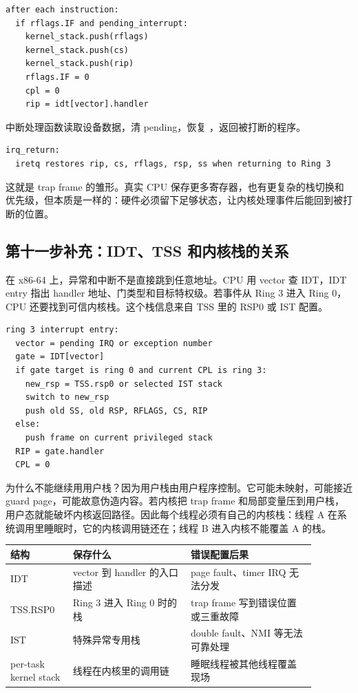 \begin{lstlisting}
after each instruction:
  if rflags.IF and pending_interrupt:
    kernel_stack.push(rflags)
    kernel_stack.push(cs)
    kernel_stack.push(rip)
    rflags.IF = 0
    cpl = 0
    rip = idt[vector].handler
\end{lstlisting}

中断处理函数读取设备数据，清 pending，恢复 ，返回被打断的程序。

\begin{lstlisting}
irq_return:
  iretq restores rip, cs, rflags, rsp, ss when returning to Ring 3
\end{lstlisting}

这就是 trap frame 的雏形。真实 CPU 保存更多寄存器，也有更复杂的栈切换和优先级，但本质是一样的：硬件必须留下足够状态，让内核处理事件后能回到被打断的位置。

\subsection{第十一步补充：IDT、TSS 和内核栈的关系}

在 x86-64 上，异常和中断不是直接跳到任意地址。CPU 用 vector 查 IDT，IDT entry 指出 handler 地址、门类型和目标特权级。若事件从 Ring 3 进入 Ring 0，CPU 还要找到可信内核栈。这个栈信息来自 TSS 里的 RSP0 或 IST 配置。

\begin{lstlisting}
ring 3 interrupt entry:
  vector = pending IRQ or exception number
  gate = IDT[vector]
  if gate target is ring 0 and current CPL is ring 3:
    new_rsp = TSS.rsp0 or selected IST stack
    switch to new_rsp
    push old SS, old RSP, RFLAGS, CS, RIP
  else:
    push frame on current privileged stack
  RIP = gate.handler
  CPL = 0
\end{lstlisting}

为什么不能继续用用户栈？因为用户栈由用户程序控制。它可能未映射，可能接近 guard page，可能故意伪造内容。若内核把 trap frame 和局部变量压到用户栈，用户态就能破坏内核返回路径。因此每个线程必须有自己的内核栈：线程 A 在系统调用里睡眠时，它的内核调用链还在；线程 B 进入内核不能覆盖 A 的栈。

\begin{longtable}{p{0.18\linewidth}p{0.34\linewidth}p{0.36\linewidth}}
\toprule
结构 & 保存什么 & 错误配置后果 \\
\midrule
IDT & vector 到 handler 的入口描述 & page fault、timer IRQ 无法分发 \\
TSS.RSP0 & Ring 3 进入 Ring 0 时的栈 & trap frame 写到错误位置或三重故障 \\
IST & 特殊异常专用栈 & double fault、NMI 等无法可靠处理 \\
per-task kernel stack & 线程在内核里的调用链 & 睡眠线程被其他线程覆盖现场 \\
\bottomrule
\end{longtable}

